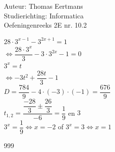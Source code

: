 \documentclass[a4paper]{article}
\begin{document}
  
\noindent \large Auteur: Thomas Eertmans \\
\noindent \large Studierichting: Informatica\\
\noindent \large Oefeningenreeks 2E nr. 10.2\\

\medskip

\normalsize

$28 \cdot 3^{x-1} - 3^{2x+1} = 1$ \\

$\Leftrightarrow \dfrac{28 \cdot 3^x}{3} - 3 \cdot 3^{2x}  - 1 = 0$ \\

$3^x = t$ \\

$\Leftrightarrow -3t^2 + \dfrac{28t}{3} - 1$ \\

$D = \dfrac{784}{9} - 4 \cdot (-3) \cdot (-1) = \dfrac{676}{9}$ \\

$t_{1,2} = \dfrac{\dfrac{-28}{3} \pm \dfrac{26}{3}}{-6} = \dfrac{1}{9}$ en $3$ \\

$3^x = \dfrac{1}{9} \Leftrightarrow x = -2$ \space  of \space $3^x = 3 \Leftrightarrow x = 1$

\begin{thebibliography}{999}
\end{thebibliography}
\end{document}
